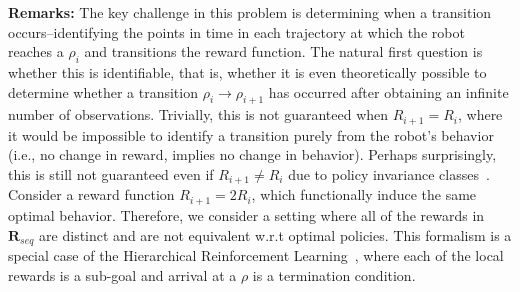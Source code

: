 \noindent \textbf{Remarks: } The key challenge in this problem is determining when a transition occurs--identifying the points in time in each trajectory at which the robot reaches a $\rho_i$ and transitions the reward function.
The natural first question is whether this is identifiable, that is, whether it is even theoretically possible to determine whether a transition $\rho_i \rightarrow \rho_{i+1}$ has occurred after obtaining an infinite number of observations. Trivially, this is not guaranteed when $R_{i+1} = R_{i}$, where it would be impossible to identify a transition purely from the robot's behavior (i.e., no change in reward, implies no change in behavior). Perhaps surprisingly, this is still not guaranteed even if $R_{i+1} \ne R_{i}$ due to policy invariance classes~\cite{DBLP:conf/icml/NgHR99}. Consider a reward function $R_{i+1} = 2R_{i}$, which functionally induce the same optimal behavior. Therefore, we consider a setting where all of the rewards in $\mathbf{R}_{seq}$ are distinct and are not equivalent w.r.t optimal policies.
This formalism is a special case of the Hierarchical Reinforcement Learning~\cite{dietterich2000hierarchical}, where each of the local rewards is a sub-goal and arrival at a $\rho$ is a termination condition. 



